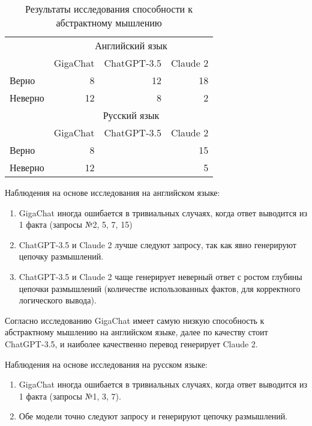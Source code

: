 \documentclass{article}
\begin{document}
\begin{table}[ht]
    \centering
    \begin{tabular}{lrrr}
        \toprule
                & \multicolumn{3}{c}{Английский язык}                          \\
        \cmidrule(r){2-4}
                & GigaChat                            & ChatGPT-3.5 & Claude 2 \\
        \midrule
        Верно   & 8                                   & 12          & 18       \\
        Неверно & 12                                  & 8           & 2        \\
        \midrule
                & \multicolumn{3}{c}{Русский язык}                             \\
        \cmidrule(r){2-4}
                & GigaChat                            & ChatGPT-3.5 & Claude 2 \\
        \midrule
        Верно   & 8                                   &             & 15       \\
        Неверно & 12                                  &             & 5        \\
        \bottomrule
    \end{tabular}
    \caption{Результаты исследования способности к абстрактному мышлению}
    \label{tab:abstract_reasoning}
\end{table}

Наблюдения на основе исследования на английском языке:
\begin{enumerate}
    \item GigaChat иногда ошибается в тривиальных случаях, когда ответ выводится из 1 факта (запросы №2, 5, 7, 15)
    \item ChatGPT-3.5 и Claude 2 лучше следуют запросу, так как явно генерируют цепочку размышлений.
    \item ChatGPT-3.5 и Claude 2 чаще генерирует неверный ответ с ростом глубины цепочки размышлений (количестве использованных фактов, для корректного логического вывода).
\end{enumerate}

Согласно исследованию GigaChat имеет самую низкую способность к абстрактному мышлению на английском языке, далее по качеству стоит ChatGPT-3.5, и наиболее качественно перевод генерирует Claude 2.

Наблюдения на основе исследования на русском языке:
\begin{enumerate}
    \item GigaChat иногда ошибается в тривиальных случаях, когда ответ выводится из 1 факта (запросы №1, 3, 7).
    \item Обе модели точно следуют запросу и генерируют цепочку размышлений.
\end{enumerate}
\end{document}
